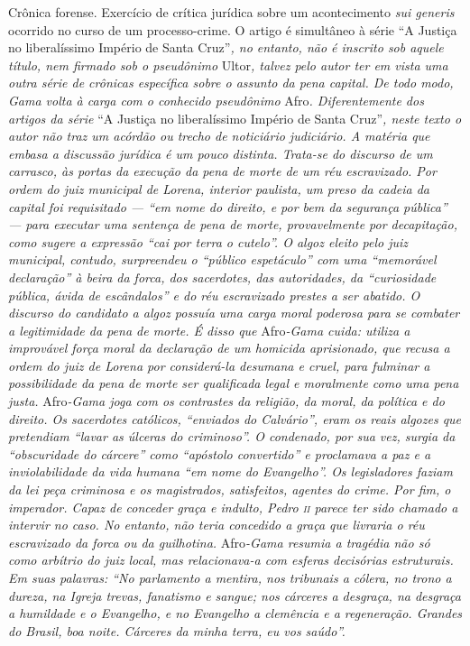 \begin{didascalia}
Crônica forense. Exercício de crítica jurídica sobre um
acontecimento\emph{ sui generis }ocorrido no curso de um processo-crime.
O artigo é simultâneo à série ``A Justiça no liberalíssimo Império de
Santa Cruz''\emph{, no entanto, não é inscrito sob aquele título, nem
firmado sob o pseudônimo} Ultor\emph{, talvez pelo autor ter em vista
uma outra série de crônicas específica sobre o assunto da pena capital.
De todo modo, Gama volta à carga com o conhecido pseudônimo} Afro\emph{.
Diferentemente dos artigos da série} ``A Justiça no liberalíssimo Império
de Santa Cruz''\emph{, neste texto o autor não traz um acórdão ou trecho
de noticiário judiciário. A matéria que embasa a discussão jurídica é um
pouco distinta. Trata-se do discurso de um carrasco, às portas da
execução da pena de morte de um réu escravizado. Por ordem do juiz
municipal de Lorena, interior paulista, um preso da cadeia da capital
foi requisitado --- ``em nome do direito, e por bem da segurança pública''
--- para executar uma sentença de pena de morte, provavelmente por
decapitação, como sugere a expressão ``cai por terra o cutelo''. O algoz
eleito pelo juiz municipal, contudo, surpreendeu o ``público espetáculo''
com uma ``memorável declaração'' à beira da forca, dos sacerdotes, das
autoridades, da ``curiosidade pública, ávida de escândalos'' e do réu
escravizado prestes a ser abatido. O discurso do candidato a algoz
possuía uma carga moral poderosa para se combater a legitimidade da pena
de morte. É disso que} Afro\emph{-Gama cuida: utiliza a improvável força
moral da declaração de um homicida aprisionado, que recusa a ordem do
juiz de Lorena por considerá-la desumana e cruel, para fulminar a
possibilidade da pena de morte ser qualificada legal e moralmente como
uma pena justa.} Afro\emph{-Gama joga com os contrastes da religião, da
moral, da política e do direito. Os sacerdotes católicos, ``enviados do
Calvário'', eram os reais algozes que pretendiam ``lavar as úlceras do
criminoso''. O condenado, por sua vez, surgia da ``obscuridade do cárcere''
como ``apóstolo convertido'' e proclamava a paz e a inviolabilidade da
vida humana ``em nome do Evangelho''. Os legisladores faziam da lei peça
criminosa e os magistrados, satisfeitos, agentes do crime. Por fim, o
imperador. Capaz de conceder graça e indulto, Pedro \textsc{ii} parece ter sido
chamado a intervir no caso. No entanto, não teria concedido a graça que
livraria o réu escravizado da forca ou da guilhotina.} Afro\emph{-Gama
resumia a tragédia não só como arbítrio do juiz local, mas relacionava-a
com esferas decisórias estruturais. Em suas palavras: ``No parlamento a
mentira, nos tribunais a cólera, no trono a dureza, na Igreja trevas,
fanatismo e sangue; nos cárceres a desgraça, na desgraça a humildade e o
Evangelho, e no Evangelho a clemência e a regeneração. Grandes do
Brasil, boa noite. Cárceres da minha terra, eu vos saúdo''.}
\end{didascalia}



